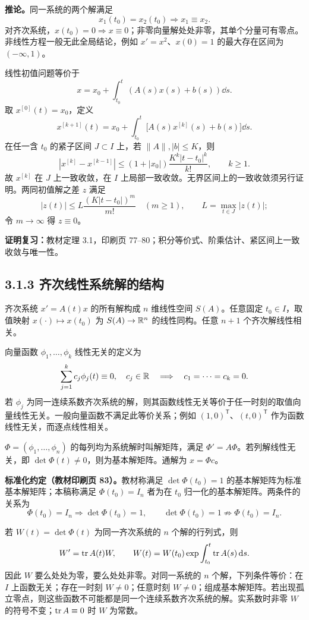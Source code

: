 \textbf{推论。}同一系统的两个解满足
\[
x_1(t_0)=x_2(t_0)\Rightarrow x_1\equiv x_2.
\]
对齐次系统，$x(t_0)=0\Rightarrow x\equiv0$；非零向量解处处非零，其单个分量可有零点。非线性方程一般无此全局结论，例如 $x'=x^2$、$x(0)=1$ 的最大存在区间为 $(-\infty,1)$。

线性初值问题等价于
\[
x=x_0+\int_{t_0}^t(A(s)x(s)+b(s))\dd s.
\]
取 $x^{[0]}(t)=x_0$，定义
\[
x^{[k+1]}(t)=x_0+\int_{t_0}^t\bigl[A(s)x^{[k]}(s)+b(s)\bigr]\dd s.
\]
在任一含 $t_0$ 的紧子区间 $J\subset I$ 上，若 $\|A\|,|b|\le K$，则
\[
|x^{[k]}-x^{[k-1]}|\le(1+|x_0|)\frac{K^k|t-t_0|^k}{k!},\qquad k\ge1.
\]
故 $x^{[k]}$ 在 $J$ 上一致收敛，在 $I$ 上局部一致收敛。无界区间上的一致收敛须另行证明。两同初值解之差 $z$ 满足
\[
|z(t)|\le L\frac{(K|t-t_0|)^m}{m!}\quad(m\ge1),\qquad L=\max_{t\in J}|z(t)|;
\]
令 $m\to\infty$ 得 $z\equiv0$。

\textbf{证明复习：}教材定理 3.1，印刷页 77--80；积分等价式、阶乘估计、紧区间上一致收敛与唯一性。

\subsection*{3.1.3 齐次线性系统解的结构}
齐次系统 $x'=A(t)x$ 的所有解构成 $n$ 维线性空间 $S(A)$。任意固定 $t_0\in I$，取值映射 $x(\cdot)\mapsto x(t_0)$ 为 $S(A)\to\mathbb R^n$ 的线性同构。任意 $n+1$ 个齐次解线性相关。

向量函数 $\phi_1,\ldots,\phi_k$ 线性无关的定义为
\[
\sum_{j=1}^k c_j\phi_j(t)\equiv0,\quad c_j\in\mathbb R
\quad\Longrightarrow\quad c_1=\cdots=c_k=0.
\]
若 $\phi_j$ 为同一连续系数齐次系统的解，则其函数线性无关等价于任一时刻的取值向量线性无关。一般向量函数不满足此等价关系；例如 $(1,0)^{\mathsf T}$、$(t,0)^{\mathsf T}$ 作为函数线性无关，而逐点线性相关。

$\Phi=(\phi_1,\ldots,\phi_n)$ 的每列均为系统解时叫解矩阵，满足 $\Phi'=A\Phi$。若列解线性无关，即 $\det\Phi(t)\ne0$，则为基本解矩阵。通解为 $x=\Phi c$。

\textbf{标准化约定（教材印刷页 83）。}教材称满足 $\det\Phi(t_0)=1$ 的基本解矩阵为标准基本解矩阵；本稿称满足 $\Phi(t_0)=I_n$ 者为在 $t_0$ 归一化的基本解矩阵。两条件的关系为
\[
\Phi(t_0)=I_n\Rightarrow\det\Phi(t_0)=1,\qquad
\det\Phi(t_0)=1\not\Rightarrow\Phi(t_0)=I_n.
\]

\core 若 $W(t)=\det\Phi(t)$ 为同一齐次系统的 $n$ 个解的行列式，则
\[
W'=\operatorname{tr} A(t)W,\qquad
W(t)=W(t_0)\exp\int_{t_0}^t\operatorname{tr} A(s)\,\mathrm d s.
\]
因此 $W$ 要么处处为零，要么处处非零。对同一系统的 $n$ 个解，下列条件等价：在 $I$ 上函数无关；存在一时刻 $W\ne0$；任意时刻 $W\ne0$；组成基本解矩阵。若出现孤立零点，则这些函数不可能都是同一个连续系数齐次系统的解。实系数时非零 $W$ 的符号不变；$\operatorname{tr} A\equiv0$ 时 $W$ 为常数。

